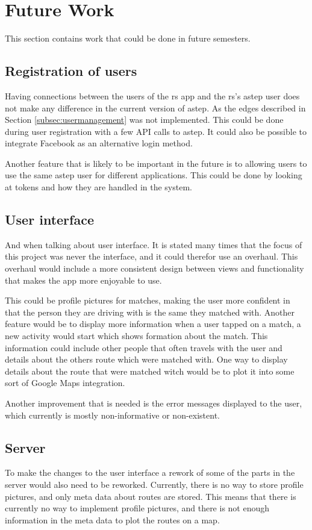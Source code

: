 \section{Future Work}\label{sec:future}
This section contains work that could be done in future semesters.

\subsection{Registration of users}
Having connections between the users of the \gls{rs} app and the \gls{rs}'s \gls{astep} user does not make any difference in the current version of \gls{astep}.
As the edges described in Section \ref{subsec:usermanagement} was not implemented.
This could be done during user registration with a few API calls to \gls{astep}.
It could also be possible to integrate Facebook as an alternative login method.

Another feature that is likely to be important in the future is to allowing users to use the same \gls{astep} user for different applications.
This could be done by looking at tokens and how they are handled in the  system.

\subsection{User interface}
And when talking about user interface.
It is stated many times that the focus of this project was never the interface, and it could therefor use an overhaul.
This overhaul would include a more consistent design between views and functionality that makes the app more enjoyable to use.

This could be profile pictures for matches, making the user more confident in that the person they are driving with is the same they matched with.
Another feature would be to display more information when a user tapped on a match, a new activity would start which shows formation about the match.
This information could include other people that often travels with the user and details about the others route which were matched with.
One way to display details about the route that were matched witch would be to plot it into some sort of Google Maps integration.

Another improvement that is needed is the error messages displayed to the user, which currently is mostly non-informative or non-existent.

\subsection{Server}
To make the changes to the user interface a rework of some of the parts in the server would also need to be reworked.
Currently, there is no way to store profile pictures, and only meta data about routes are stored.
This means that there is currently no way to implement profile pictures, and there is not enough information in the meta data to plot the routes on a map.


